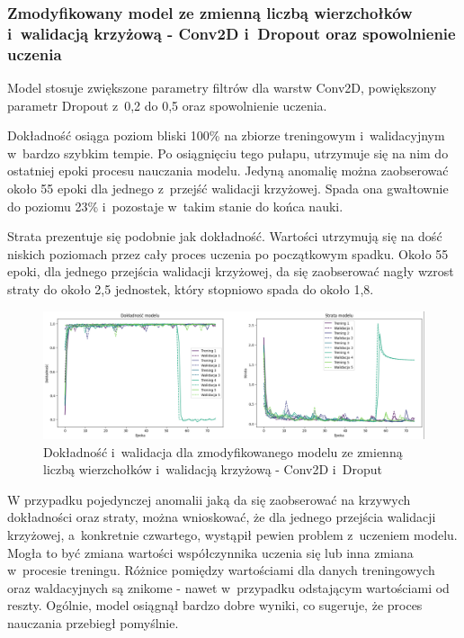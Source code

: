 \subsubsection{Zmodyfikowany model ze zmienną liczbą wierzchołków i~walidacją krzyżową - Conv2D i~Dropout oraz spowolnienie uczenia}

Model stosuje zwiększone parametry filtrów dla warstw Conv2D, powiększony parametr Dropout z~0,2 do 0,5
oraz spowolnienie uczenia.

Dokładność osiąga poziom bliski 100\% na zbiorze treningowym i~walidacyjnym w~bardzo szybkim tempie.
Po osiągnięciu tego pułapu, utrzymuje się na nim do ostatniej epoki procesu nauczania modelu.
Jedyną anomalię można zaobserować około 55 epoki dla jednego z~przejść walidacji krzyżowej.
Spada ona gwałtownie do poziomu 23\% i~pozostaje w~takim stanie do końca nauki.

Strata prezentuje się podobnie jak dokładność.
Wartości utrzymują się na dość niskich poziomach przez cały proces uczenia po początkowym spadku.
Około 55 epoki, dla jednego przejścia walidacji krzyżowej,
da się zaobserować nagły wzrost straty do około 2,5 jednostek, który stopniowo spada do około 1,8.

\begin{figure}[ht]
	\centering
	\includegraphics[width=15.5cm]{resources/tests/images/v4/multiple_edges_crossvalid_1_img.png}
	\caption{Dokładność i~walidacja dla zmodyfikowanego modelu ze zmienną liczbą wierzchołków i~walidacją krzyżową - Conv2D i~Droput}
	\label{Fig:tests-csvar-1a}
\end{figure}
\FloatBarrier

W przypadku pojedynczej anomalii jaką da się zaobserować na krzywych dokładności oraz straty,
można wnioskować, że dla jednego przejścia walidacji krzyżowej, a~konkretnie czwartego, wystąpił pewien problem z~uczeniem modelu.
Mogła to być zmiana wartości współczynnika uczenia się lub inna zmiana w~procesie treningu.
Różnice pomiędzy wartościami dla danych treningowych oraz waldacyjnych są znikome - nawet w~przypadku odstającym wartościami od reszty.
Ogólnie, model osiągnął bardzo dobre wyniki, co sugeruje, że proces nauczania przebiegł pomyślnie.


